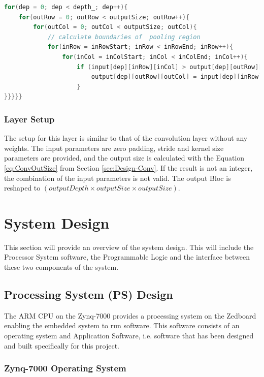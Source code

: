 \documentclass[12pt]{article}
\begin{document}
\renewcommand{\lstlistingname}{Code}
\begin{lstlisting}[caption=Max Pooling Computation, label=code:pool, language=C, float=ht]
for(dep = 0; dep < depth_; dep++){
	for(outRow = 0; outRow < outputSize; outRow++){
		for(outCol = 0; outCol < outputSize; outCol){
			// calculate boundaries of 	pooling region
			for(inRow = inRowStart; inRow < inRowEnd; inRow++){
				for(inCol = inColStart; inCol < inColEnd; inCol++){
					if (input[dep][inRow][inCol] > output[dep][outRow][outCol]){
						output[dep][outRow][outCol] = input[dep][inRow][inCol];
					}
}}}}}
\end{lstlisting}

\subsubsection{Layer Setup}
\label{sec:Design-Pool-Setup}

The setup for this layer is similar to that of the convolution layer without any weights. The input parameters are zero padding, stride and kernel size parameters are provided, and the output size is calculated with the Equation \ref{eq:ConvOutSize} from Section \ref{sec:Design-Conv}. If the result is not an integer, the combination of the input parameters is not valid. The output Bloc is reshaped to $(outputDepth \times outputSize \times outputSize)$.

\newpage

\section{System Design}
\label{sec:Design}

This section will provide an overview of the system design. This will include the Processor System software, the Programmable Logic and the interface between these two components of the system.

\subsection{Processing System (PS) Design}
\label{sec:Design-PS}

The ARM CPU on the Zynq-7000 provides a processing system on the Zedboard enabling the embedded system to run software. This software consists of an operating system and Application Software, i.e. software that has been designed and built specifically for this project.

\subsubsection{Zynq-7000 Operating System}
\label{sec:Design-PS-OS}
\end{document}

